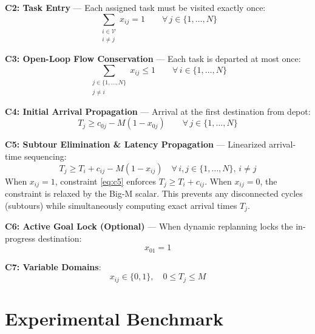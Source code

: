 \documentclass[10pt, twocolumn]{article}
\begin{document}
\textbf{C2: Task Entry} --- Each assigned task must be visited exactly once:
\begin{equation}
  \sum_{\substack{i \in \mathcal{V} \\ i \neq j}} x_{ij} = 1
  \qquad \forall\, j \in \{1, \ldots, N\}
  \label{eq:c2}
\end{equation}

\textbf{C3: Open-Loop Flow Conservation} --- Each task is departed at most once:
\begin{equation}
  \sum_{\substack{j \in \{1,\ldots,N\} \\ j \neq i}} x_{ij} \leq 1
  \qquad \forall\, i \in \{1, \ldots, N\}
  \label{eq:c3}
\end{equation}

\textbf{C4: Initial Arrival Propagation} --- Arrival at the first destination from depot:
\begin{equation}
  T_j \geq c_{0j} - M(1 - x_{0j})
  \qquad \forall\, j \in \{1, \ldots, N\}
  \label{eq:c4}
\end{equation}

\textbf{C5: Subtour Elimination \& Latency Propagation} --- Linearized arrival-time sequencing:
\begin{equation}
  T_j \geq T_i + c_{ij} - M(1 - x_{ij})
  \quad \forall\, i, j \in \{1,\ldots,N\},\, i \neq j
  \label{eq:c5}
\end{equation}
When $x_{ij} = 1$, constraint \eqref{eq:c5} enforces $T_j \geq T_i + c_{ij}$. When $x_{ij} = 0$, the constraint is relaxed by the Big-M scalar. This prevents any disconnected cycles (subtours) while simultaneously computing exact arrival times $T_j$.

\textbf{C6: Active Goal Lock (Optional)} --- When dynamic replanning locks the in-progress destination:
\begin{equation}
  x_{01} = 1
  \label{eq:c6}
\end{equation}

\textbf{C7: Variable Domains}:
\begin{equation}
  x_{ij} \in \{0,1\}, \quad 0 \leq T_j \leq M
  \label{eq:c7}
\end{equation}

\section{Experimental Benchmark}
\end{document}
